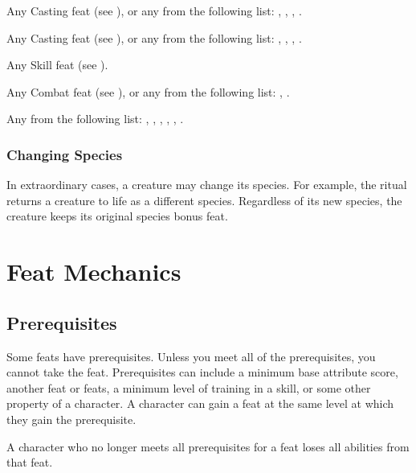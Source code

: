          Any Casting feat (see ), or any from the following list: , , , .

         Any Casting feat (see ), or any from the following list: , , , .

         Any Skill feat (see ).

         Any Combat feat (see ), or any from the following list: , .

         Any from the following list: , , , , , .

        \subsubsection{Changing Species}
            In extraordinary cases, a creature may change its species.
            For example, the  ritual returns a creature to life as a different species.
            Regardless of its new species, the creature keeps its original species bonus feat.

\section{Feat Mechanics}

    \subsection{Prerequisites}
        Some feats have prerequisites.
        Unless you meet all of the prerequisites, you cannot take the feat.
        Prerequisites can include a minimum base attribute score, another feat or feats, a minimum level of training in a skill, or some other property of a character.
        A character can gain a feat at the same level at which they gain the prerequisite.

        A character who no longer meets all prerequisites for a feat loses all abilities from that feat.

